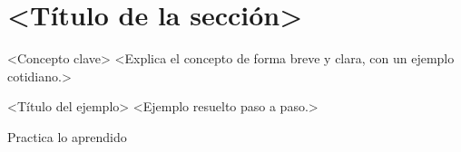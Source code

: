 

\renewcommand{\hdrcapitulo}{<Asignatura> · <Grado> · <Tema>}



\section{<Título de la sección>}

\begin{definicion}{<Concepto clave>}
<Explica el concepto de forma breve y clara, con un ejemplo cotidiano.>
\end{definicion}

\begin{ejemplo}{<Título del ejemplo>}
<Ejemplo resuelto paso a paso.>
\end{ejemplo}


\begin{practica}{Practica lo aprendido}
\basico
{}
\intermedio
{}
\reto
{}
\end{practica}


